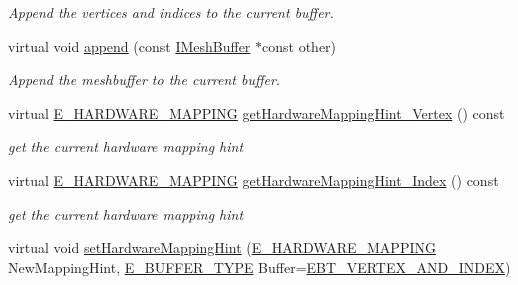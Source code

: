 \begin{DoxyCompactItemize}
\begin{DoxyCompactList}\small\item\em Append the vertices and indices to the current buffer. \end{DoxyCompactList}\item 
virtual void \hyperlink{classirr_1_1scene_1_1CMeshBuffer_af48b88e6c1bd79e6abd6a6803aa106c0}{append} (const \hyperlink{classirr_1_1scene_1_1IMeshBuffer}{I\+Mesh\+Buffer} $\ast$const other)
\begin{DoxyCompactList}\small\item\em Append the meshbuffer to the current buffer. \end{DoxyCompactList}\item 
\mbox{\label{classirr_1_1scene_1_1CMeshBuffer_adae334e8431e647d837acda0fada8bd5}} 
virtual \hyperlink{namespaceirr_1_1scene_ac7d8ee8d77da75f2580bb9bb17231c27}{E\+\_\+\+H\+A\+R\+D\+W\+A\+R\+E\+\_\+\+M\+A\+P\+P\+I\+NG} \hyperlink{classirr_1_1scene_1_1CMeshBuffer_adae334e8431e647d837acda0fada8bd5}{get\+Hardware\+Mapping\+Hint\+\_\+\+Vertex} () const
\begin{DoxyCompactList}\small\item\em get the current hardware mapping hint \end{DoxyCompactList}\item 
\mbox{\label{classirr_1_1scene_1_1CMeshBuffer_a3f6eb99f71576b72225ac3eccd68efbe}} 
virtual \hyperlink{namespaceirr_1_1scene_ac7d8ee8d77da75f2580bb9bb17231c27}{E\+\_\+\+H\+A\+R\+D\+W\+A\+R\+E\+\_\+\+M\+A\+P\+P\+I\+NG} \hyperlink{classirr_1_1scene_1_1CMeshBuffer_a3f6eb99f71576b72225ac3eccd68efbe}{get\+Hardware\+Mapping\+Hint\+\_\+\+Index} () const
\begin{DoxyCompactList}\small\item\em get the current hardware mapping hint \end{DoxyCompactList}\item 
\mbox{\label{classirr_1_1scene_1_1CMeshBuffer_aa86cd9ffbe81c9f86a6096b2e5d3410e}} 
virtual void \hyperlink{classirr_1_1scene_1_1CMeshBuffer_aa86cd9ffbe81c9f86a6096b2e5d3410e}{set\+Hardware\+Mapping\+Hint} (\hyperlink{namespaceirr_1_1scene_ac7d8ee8d77da75f2580bb9bb17231c27}{E\+\_\+\+H\+A\+R\+D\+W\+A\+R\+E\+\_\+\+M\+A\+P\+P\+I\+NG} New\+Mapping\+Hint, \hyperlink{namespaceirr_1_1scene_a8f59a89ffef0ad8e5b2c2cb874a93e8c}{E\+\_\+\+B\+U\+F\+F\+E\+R\+\_\+\+T\+Y\+PE} Buffer=\hyperlink{namespaceirr_1_1scene_a8f59a89ffef0ad8e5b2c2cb874a93e8ca34ea664123fbc28610408e51b014dcdd}{E\+B\+T\+\_\+\+V\+E\+R\+T\+E\+X\+\_\+\+A\+N\+D\+\_\+\+I\+N\+D\+EX})

\end{DoxyCompactItemize}
